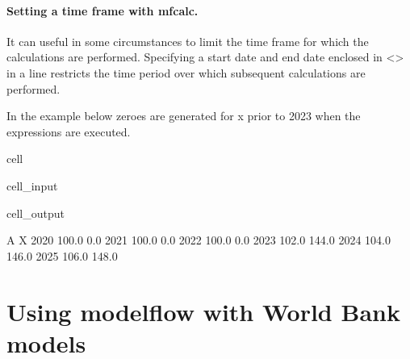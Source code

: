 \documentclass[letterpaper,10pt,english]{jupyterBook}
\begin{document}
\subsection{Setting a time frame with mfcalc.}
\label{\detokenize{content/04_PythonEssentials/mfcalc:setting-a-time-frame-with-mfcalc}}
\sphinxAtStartPar
It can useful in some circumstances to limit the time frame for which the calculations are performed. Specifying a start date and end date enclosed in <> in a line restricts the time period over which subsequent calculations are performed.

\sphinxAtStartPar
In the example below zeroes are generated for x prior to 2023 when the expressions are executed.

\begin{sphinxuseclass}{cell}\begin{sphinxVerbatimInput}

\begin{sphinxuseclass}{cell_input}
\begin{sphinxVerbatim}[commandchars=\\\{\}]
  


\end{sphinxVerbatim}

\end{sphinxuseclass}\end{sphinxVerbatimInput}
\begin{sphinxVerbatimOutput}

\begin{sphinxuseclass}{cell_output}
\begin{sphinxVerbatim}[commandchars=\\\{\}]
          A      X
2020  100.0    0.0
2021  100.0    0.0
2022  100.0    0.0
2023  102.0  144.0
2024  104.0  146.0
2025  106.0  148.0
\end{sphinxVerbatim}

\end{sphinxuseclass}\end{sphinxVerbatimOutput}

\end{sphinxuseclass}
\sphinxstepscope


\part{Using modelflow with World Bank models}
\end{document}
